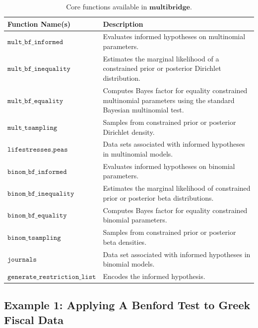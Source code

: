 \documentclass[
  english,
  man,floatsintext]{apa6}
\begin{document}
\begin{table}[H]
\caption {Core functions available in $\textbf{multibridge}$.}
\label{table:core_functions}
\begin{center}
\begin{tabular}{p{5.5cm}p{10.5cm}}
        \toprule
Function Name(s) & Description \\\midrule
$\texttt{mult\_bf\_informed}$ & Evaluates informed hypotheses on multinomial parameters.  \\
$\texttt{mult\_bf\_inequality}$ & Estimates the marginal likelihood of a constrained prior or posterior Dirichlet distribution.  \\
$\texttt{mult\_bf\_equality}$ & Computes Bayes factor for equality constrained multinomial parameters using the standard Bayesian multinomial test.  \\
$\texttt{mult\_tsampling}$ & Samples from constrained prior or posterior Dirichlet density.\\
$ \texttt{lifestresses}, \texttt{peas}$ & Data sets associated with informed hypotheses in multinomial models.\\\midrule
$\texttt{binom\_bf\_informed}$ & Evaluates informed hypotheses on binomial parameters.  \\
$\texttt{binom\_bf\_inequality}$ & Estimates the marginal likelihood of constrained prior or posterior beta distributions.\\
$\texttt{binom\_bf\_equality}$ & Computes Bayes factor for equality constrained binomial parameters. \\
$\texttt{binom\_tsampling}$ & Samples from constrained prior or posterior beta densities.\\
$ \texttt{journals}$ & Data set associated with informed hypotheses in binomial models.\\\midrule
$ \texttt{generate\_restriction\_list}$ & Encodes the informed hypothesis.\\
\bottomrule
\end{tabular}
\end{center}
\end{table}

\hypertarget{example-1-applying-a-benford-test-to-greek-fiscal-data}{%
\subsection{Example 1: Applying A Benford Test to Greek Fiscal Data}\label{example-1-applying-a-benford-test-to-greek-fiscal-data}}
\end{document}
